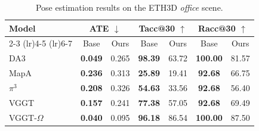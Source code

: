 \begin{table}[tbp]
\centering
\setlength{\tabcolsep}{3pt}
\caption{Pose estimation results on the ETH3D \emph{office} scene.}
\label{tab:office_pose}
\begin{tabular}{lcccccc}
\toprule
\multirow{2}{*}{Model} & \multicolumn{2}{c}{ATE $\downarrow$} & \multicolumn{2}{c}{Tacc@30 $\uparrow$} & \multicolumn{2}{c}{Racc@30 $\uparrow$} \\
\cmidrule(lr){2-3} \cmidrule(lr){4-5} \cmidrule(lr){6-7}
 & Base & Ours & Base & Ours & Base & Ours \\
\midrule
DA3           & \textbf{0.049} & 0.265 & \textbf{98.39} & 63.72 & \textbf{100.00} & 81.57 \\
MapA          & \textbf{0.236} & 0.313 & \textbf{25.89} & 19.41 & \textbf{92.68}  & 66.75 \\
$\pi^3$       & \textbf{0.208} & 0.326 & \textbf{54.63} & 33.56 & \textbf{92.68}  & 56.40 \\
VGGT          & \textbf{0.157} & 0.241 & \textbf{77.38} & 57.05 & \textbf{92.68}  & 69.49 \\
VGGT-$\Omega$ & \textbf{0.040} & 0.095 & \textbf{96.18} & 86.54 & \textbf{100.00} & 87.50 \\
\bottomrule
\end{tabular}
\end{table}